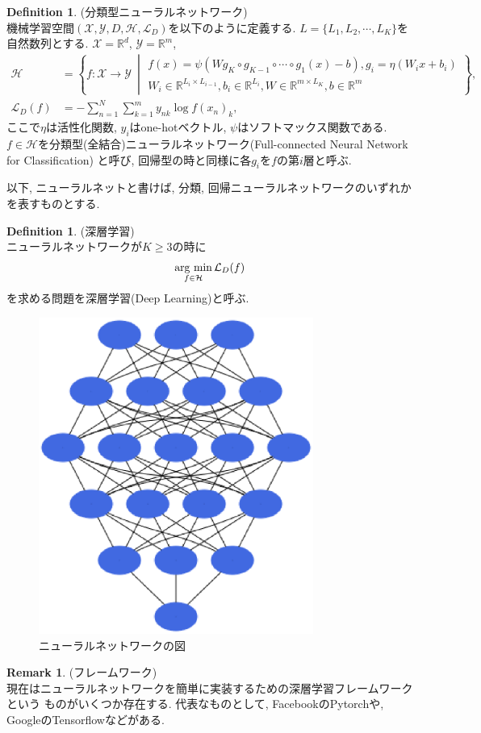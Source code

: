 \documentclass[11pt, a4paper, dvipdfmx]{jsarticle}
\theoremstyle{definition}
\newtheorem{Definition+}[Axiom+]{Definition}
\newtheorem{Remark+}[Axiom+]{Remark}
\newcommand{\R}{\mathbb{R}}
\newcommand{\X}{\mathcal{X}}
\newcommand{\Y}{\mathcal{Y}}
\newcommand{\Hil}{\mathcal{H}}
\newcommand{\Loss}{\mathcal{L}_{D}}
\newcommand{\MLsp}{(\X, \Y, D, \Hil, \Loss)}
\newcommand{\argmin}{\mathop{\rm arg~min}\limits}
\begin{document}
\begin{Definition+}(分類型ニューラルネットワーク)\\
    機械学習空間$\MLsp$を以下のように定義する. $L = \{L_{1}, L_{2}, \cdots, L_{K}\}$を自然数列とする.
    $\X = \R^d$, $\Y = \R^{m}$, 
    \begin{align*}
        \Hil &= \left\{f:\X\to\Y~\middle|
        \begin{array}{l}
            f(x) = \psi(W g_{K}\circ g_{K - 1}\circ\cdots\circ g_{1}(x) - b), g_{i} = \eta(W_{i}x + b_{i})\\
            W_{i}\in\R^{L_{i}\times L_{i - 1}}, b_{i}\in\R^{L_{i}}, W\in\R^{m\times L_{K}}, b\in\R^{m}
        \end{array}
        \right\},\\
        \Loss(f) &= -\sum_{n = 1}^{N}\sum_{k = 1}^{m}y_{nk}\log f(x_n)_{k},
    \end{align*}
    ここで$\eta$は活性化関数, $y_{i}$はone-hotベクトル, $\psi$はソフトマックス関数である. $f\in\Hil$を分類型(全結合)ニューラルネットワーク(Full-connected Neural Network for Classification)
    と呼び, 回帰型の時と同様に各$g_{i}$を$f$の第$i$層と呼ぶ.
\end{Definition+}
以下, ニューラルネットと書けば, 分類, 回帰ニューラルネットワークのいずれかを表すものとする. 
\begin{Definition+}(深層学習)\\
    ニューラルネットワークが$K \geq 3$の時に
    \begin{align*}
        \argmin_{f\in\Hil}\Loss(f)
    \end{align*}
    を求める問題を深層学習(Deep Learning)と呼ぶ.
\end{Definition+}
\begin{figure}[H]
    \centering
    \includegraphics[width = 9.0cm, angle=90]{Images/NN.eps}
    \caption{ニューラルネットワークの図}
\end{figure}
\begin{Remark+}(フレームワーク)\\
    現在はニューラルネットワークを簡単に実装するための深層学習フレームワークという
    ものがいくつか存在する. 代表なものとして, FacebookのPytorchや, GoogleのTensorflowなどがある.
\end{Remark+}
\end{document}
